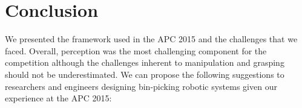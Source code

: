 \documentclass[letterpaper, 10pt, conference]{ieeeconf}
\begin{document}












\section{Conclusion}
\label{sec:conclusion}

We presented the framework used in the APC 2015 and the challenges that we faced.
Overall, perception was the most challenging component for the competition although
the challenges inherent to manipulation and grasping should not be underestimated. We can propose
the following suggestions to researchers and engineers designing bin-picking robotic
systems given our experience at the APC 2015:
\end{document}
